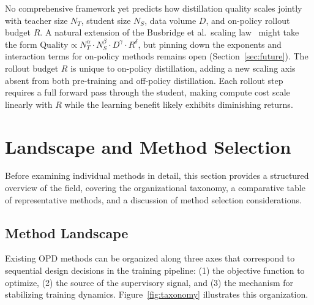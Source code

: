 \documentclass{article} %
\begin{document}
No comprehensive framework yet predicts how distillation quality scales jointly with teacher size $N_T$, student size $N_S$, data volume $D$, and on-policy rollout budget $R$. A natural extension of the Busbridge et al.\ scaling law~\citep{2502.08606} might take the form $\text{Quality} \propto N_T^\alpha \cdot N_S^\beta \cdot D^\gamma \cdot R^\delta$, but pinning down the exponents and interaction terms for on-policy methods remains open (Section~\ref{sec:future}). The rollout budget $R$ is unique to on-policy distillation, adding a new scaling axis absent from both pre-training and off-policy distillation. Each rollout step requires a full forward pass through the student, making compute cost scale linearly with $R$ while the learning benefit likely exhibits diminishing returns.

\section{Landscape and Method Selection}
\label{sec:landscape}

Before examining individual methods in detail, this section provides a structured overview of the field, covering the organizational taxonomy, a comparative table of representative methods, and a discussion of method selection considerations.

\subsection{Method Landscape}

Existing OPD methods can be organized along three axes that correspond to sequential design decisions in the training pipeline: (1) the objective function to optimize, (2) the source of the supervisory signal, and (3) the mechanism for stabilizing training dynamics. Figure~\ref{fig:taxonomy} illustrates this organization.
\end{document}
